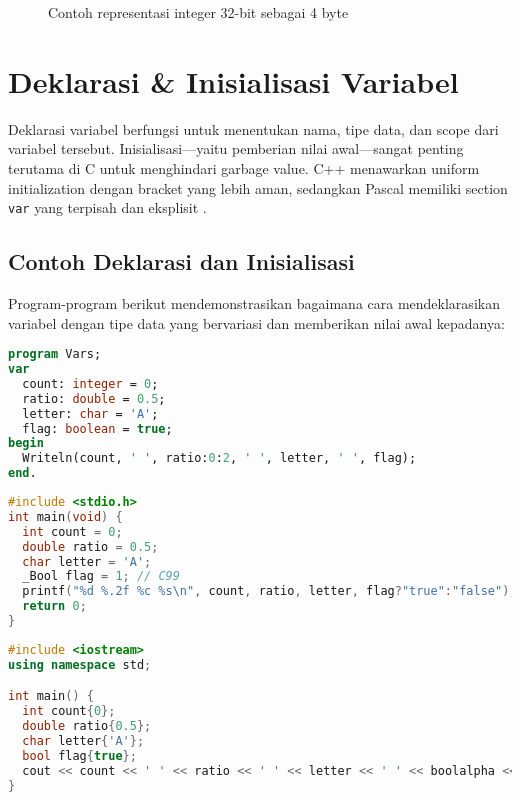 \documentclass[../main.tex]{subfiles}
\begin{document}
\begin{figure}[H]
  \centering
  \caption{Contoh representasi integer 32-bit sebagai 4 byte}
\end{figure}

\section{Deklarasi \& Inisialisasi Variabel}
Deklarasi variabel berfungsi untuk menentukan nama, tipe data, dan scope dari variabel tersebut. Inisialisasi—yaitu pemberian nilai awal—sangat penting terutama di C untuk menghindari garbage value. C++ menawarkan uniform initialization dengan bracket yang lebih aman, sedangkan Pascal memiliki section \texttt{var} yang terpisah dan eksplisit \parencite{pascal-tutorial-wikibooks,gnu-c-manual,cpp-reference}.

\subsection{Contoh Deklarasi dan Inisialisasi}

Program-program berikut mendemonstrasikan bagaimana cara mendeklarasikan variabel dengan tipe data yang bervariasi dan memberikan nilai awal kepadanya:

\begin{lstlisting}[language=Pascal, caption={Deklarasi dan inisialisasi di Pascal}]
program Vars;
var
  count: integer = 0;
  ratio: double = 0.5;
  letter: char = 'A';
  flag: boolean = true;
begin
  Writeln(count, ' ', ratio:0:2, ' ', letter, ' ', flag);
end.
\end{lstlisting}

\begin{lstlisting}[language=C, caption={Deklarasi dan inisialisasi di C}]
#include <stdio.h>
int main(void) {
  int count = 0;
  double ratio = 0.5;
  char letter = 'A';
  _Bool flag = 1; // C99
  printf("%d %.2f %c %s\n", count, ratio, letter, flag?"true":"false");
  return 0;
}
\end{lstlisting}

\begin{lstlisting}[language=C++, caption={Deklarasi dan inisialisasi di C++}]
#include <iostream>
using namespace std;

int main() {
  int count{0};
  double ratio{0.5};
  char letter{'A'};
  bool flag{true};
  cout << count << ' ' << ratio << ' ' << letter << ' ' << boolalpha << flag << '\n';
}
\end{lstlisting}
\end{document}
